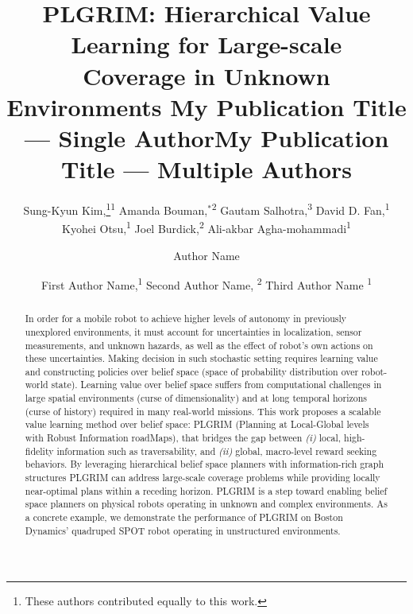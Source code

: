 \documentclass[letterpaper]{article} %
\title{
    PLGRIM: Hierarchical Value Learning for Large-scale \\Coverage in Unknown Environments
}
\author{
    Sung-Kyun Kim,\thanks{These authors contributed equally to this work.}\textsuperscript{\rm 1}
    Amanda Bouman,$^{*}$\textsuperscript{\rm 2}
    Gautam Salhotra,\textsuperscript{\rm 3}
    David D. Fan,\textsuperscript{\rm 1} \\
    Kyohei Otsu,\textsuperscript{\rm 1}
    Joel Burdick,\textsuperscript{\rm 2}
    Ali-akbar Agha-mohammadi\textsuperscript{\rm 1} \\
}
\title{My Publication Title --- Single Author}
\author {
    Author Name \\
}
\title{My Publication Title --- Multiple Authors}
\author {
    First Author Name,\textsuperscript{\rm 1}
    Second Author Name, \textsuperscript{\rm 2}
    Third Author Name \textsuperscript{\rm 1} \\
}
\begin{document}
\maketitle

\begin{abstract}
In order for a mobile robot to achieve higher levels of autonomy in previously unexplored environments, it must account for uncertainties in localization, sensor measurements, and unknown hazards, as well as the effect of robot's own actions on these uncertainties. 
%
Making decision in such stochastic setting requires learning value and constructing policies over belief space (space of probability distribution over robot-world state). 
%
Learning value over belief space suffers from computational challenges in large spatial environments (curse of dimensionality) and at long temporal horizons (curse of history) required in many real-world missions. %
This work proposes a scalable value learning method over belief space: PLGRIM (Planning at Local-Global levels with Robust Information roadMaps), that bridges the gap between \textit{(i)} local, high-fidelity information such as traversability, and \textit{(ii)} global, macro-level reward seeking behaviors.
%
By leveraging hierarchical belief space planners with information-rich graph structures PLGRIM can address large-scale coverage problems while providing locally near-optimal plans within a receding horizon.
PLGRIM is a step toward enabling belief space planners %
on physical robots operating in unknown and complex environments. 
%
As a concrete example, we demonstrate the performance of PLGRIM on Boston Dynamics' quadruped SPOT robot operating in unstructured environments.


\end{abstract}
\end{document}
